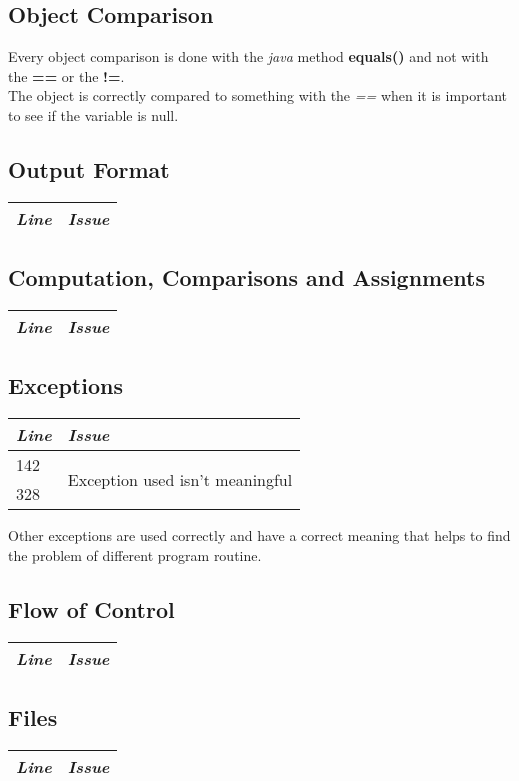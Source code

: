 \documentclass[11pt,a4paper]{report}
\begin{document}
\subsection{Object Comparison}
Every object comparison is done with the \textit{java} method \textbf{equals()} and not with the \textbf{==} or the \textbf{!=}.\\The object is correctly compared to something with the \textit{==} when it is important to see if the variable is null.
\subsection{Output Format}
\begin{tabularx}{\textwidth}{|l|X|}
	\hline
	\textit{Line} & \textit{Issue}\\
	\hline
\end{tabularx}
\subsection{Computation, Comparisons and Assignments}
\begin{tabularx}{\textwidth}{|l|X|}
	\hline
	\textit{Line} & \textit{Issue}\\
	\hline
\end{tabularx}
\subsection{Exceptions}
\begin{tabularx}{\textwidth}{|l|X|}
	\hline
	\textit{Line} & \textit{Issue}\\
	\hline
	142 & \multirow{2}{*}{Exception used isn't meaningful}\\
	328 & \\
	\hline
\end{tabularx}
Other exceptions are used correctly and have a correct meaning that helps to find the problem of different program routine.
\subsection{Flow of Control}
\begin{tabularx}{\textwidth}{|l|X|}
	\hline
	\textit{Line} & \textit{Issue}\\
	\hline
\end{tabularx}
\subsection{Files}
\begin{tabularx}{\textwidth}{|l|X|}
	\hline
	\textit{Line} & \textit{Issue}\\
	\hline
\end{tabularx}
\end{document}

